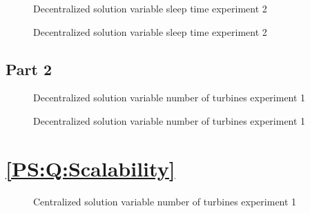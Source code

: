 \begin{figure}[h]
	
	\caption{Decentralized solution variable sleep time experiment 2}
	\label{fig:exp:decen:sleep2}
\end{figure}

\begin{figure}[h]
	
	\caption{Decentralized solution variable sleep time experiment 2}
	\label{fig:exp:decen:sleep2_cache}
\end{figure}

\subsection{Part 2}

\begin{figure}[h]
	
	\caption{Decentralized solution variable number of turbines experiment 1}
	\label{fig:exp:decen:turbines}
\end{figure}

\begin{figure}[h]
	
	\caption{Decentralized solution variable number of turbines experiment 1}
	\label{fig:exp:decen:turbines_cache}
\end{figure}

\section{\ref{PS:Q:Scalability}}

\begin{figure}[h]
	
	\caption{Centralized solution variable number of turbines experiment 1}
	\label{fig:exp:cen:turbines}
\end{figure}
